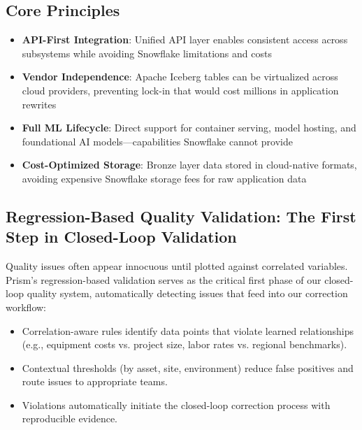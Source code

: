 \documentclass[12pt, a4paper]{article}
\begin{document}
\subsection{Core Principles}
\begin{itemize}[leftmargin=*, nosep]
    \item \textbf{API-First Integration}: Unified API layer enables consistent access across subsystems while avoiding Snowflake limitations and costs
    \item \textbf{Vendor Independence}: Apache Iceberg tables can be virtualized across cloud providers, preventing lock-in that would cost millions in application rewrites
    \item \textbf{Full ML Lifecycle}: Direct support for container serving, model hosting, and foundational AI models—capabilities Snowflake cannot provide
    \item \textbf{Cost-Optimized Storage}: Bronze layer data stored in cloud-native formats, avoiding expensive Snowflake storage fees for raw application data
\end{itemize}

\subsection{Regression-Based Quality Validation: The First Step in Closed-Loop Validation}
Quality issues often appear innocuous until plotted against correlated variables. Prism's regression-based validation serves as the critical first phase of our closed-loop quality system, automatically detecting issues that feed into our correction workflow:
\begin{itemize}[leftmargin=*, nosep]
    \item Correlation-aware rules identify data points that violate learned relationships (e.g., equipment costs vs. project size, labor rates vs. regional benchmarks).
    \item Contextual thresholds (by asset, site, environment) reduce false positives and route issues to appropriate teams.
    \item Violations automatically initiate the closed-loop correction process with reproducible evidence.
\end{itemize}
\end{document}
